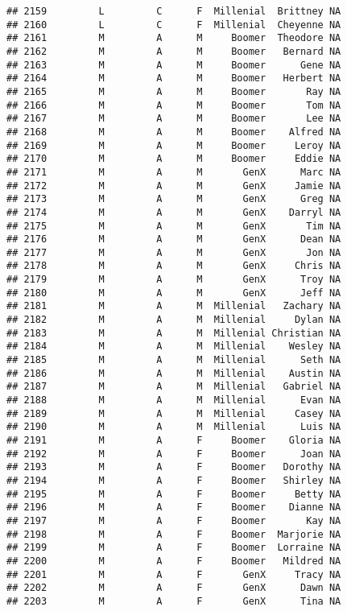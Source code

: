 \documentclass[
]{article}
\begin{document}
\begin{verbatim}
## 2159         L         C      F  Millenial  Brittney NA
## 2160         L         C      F  Millenial  Cheyenne NA
## 2161         M         A      M     Boomer  Theodore NA
## 2162         M         A      M     Boomer   Bernard NA
## 2163         M         A      M     Boomer      Gene NA
## 2164         M         A      M     Boomer   Herbert NA
## 2165         M         A      M     Boomer       Ray NA
## 2166         M         A      M     Boomer       Tom NA
## 2167         M         A      M     Boomer       Lee NA
## 2168         M         A      M     Boomer    Alfred NA
## 2169         M         A      M     Boomer     Leroy NA
## 2170         M         A      M     Boomer     Eddie NA
## 2171         M         A      M       GenX      Marc NA
## 2172         M         A      M       GenX     Jamie NA
## 2173         M         A      M       GenX      Greg NA
## 2174         M         A      M       GenX    Darryl NA
## 2175         M         A      M       GenX       Tim NA
## 2176         M         A      M       GenX      Dean NA
## 2177         M         A      M       GenX       Jon NA
## 2178         M         A      M       GenX     Chris NA
## 2179         M         A      M       GenX      Troy NA
## 2180         M         A      M       GenX      Jeff NA
## 2181         M         A      M  Millenial   Zachary NA
## 2182         M         A      M  Millenial     Dylan NA
## 2183         M         A      M  Millenial Christian NA
## 2184         M         A      M  Millenial    Wesley NA
## 2185         M         A      M  Millenial      Seth NA
## 2186         M         A      M  Millenial    Austin NA
## 2187         M         A      M  Millenial   Gabriel NA
## 2188         M         A      M  Millenial      Evan NA
## 2189         M         A      M  Millenial     Casey NA
## 2190         M         A      M  Millenial      Luis NA
## 2191         M         A      F     Boomer    Gloria NA
## 2192         M         A      F     Boomer      Joan NA
## 2193         M         A      F     Boomer   Dorothy NA
## 2194         M         A      F     Boomer   Shirley NA
## 2195         M         A      F     Boomer     Betty NA
## 2196         M         A      F     Boomer    Dianne NA
## 2197         M         A      F     Boomer       Kay NA
## 2198         M         A      F     Boomer  Marjorie NA
## 2199         M         A      F     Boomer  Lorraine NA
## 2200         M         A      F     Boomer   Mildred NA
## 2201         M         A      F       GenX     Tracy NA
## 2202         M         A      F       GenX      Dawn NA
## 2203         M         A      F       GenX      Tina NA

\end{verbatim}
\end{document}
